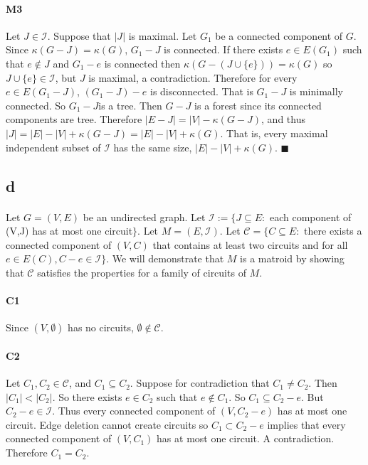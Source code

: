 \documentclass[letterpaper,12pt,oneside,onecolumn]{report}
\begin{document}
\paragraph{M3}
Let $J \in \mathcal{I}$. Suppose that $|J|$ is maximal. Let $G_1$ be a connected component of $G$. Since $\kappa(G-J) = \kappa(G)$, $G_1 - J$ is connected. If there exists $e \in E(G_1)$ such that $e \not\in J$ and $G_1 - e$ is connected then $\kappa(G-(J \cup \{e\})) = \kappa(G)$ so $J \cup \{e\} \in \mathcal{I}$, but $J$ is maximal, a contradiction. Therefore for every $e \in E(G_1-J)$, $(G_1 - J) - e$ is disconnected. That is $G_1 - J$ is minimally connected. So $G_1 - J$is a tree. Then $G - J$ is a forest since its connected components are tree. Therefore $|E-J| = |V| - \kappa(G-J)$, and thus $|J| = |E| - |V| + \kappa(G-J) = |E| - |V| + \kappa(G)$. That is, every maximal independent subset of $\mathcal{I}$ has the same size, $|E| - |V| + \kappa(G)$. $\blacksquare$
\subsection*{d}
\paragraph{}
Let $G=(V,E)$ be an undirected graph. Let $\mathcal{I} := \{J \subseteq E : $ each component of (V,J) has at most one circuit$\}$. Let $M = (E, \mathcal{I})$. Let $\mathcal{C} = \{C \subseteq E : $ there exists a connected component of $(V,C)$ that contains at least two circuits and for all $e \in E(C), C - e \in \mathcal{I} \}$. We will demonstrate that $M$ is a matroid by showing that $\mathcal{C}$ satisfies the properties for a family of circuits of $M$.
\paragraph{C1}
Since $(V, \emptyset)$ has no circuits, $\emptyset \not\in \mathcal{C}$.
\paragraph{C2}
Let $C_1, C_2 \in \mathcal{C}$, and $C_1 \subseteq C_2$. Suppose for contradiction that $C_1 \neq C_2$. Then $|C_1| < |C_2|$. So there exists $e \in C_2$ such that $e \not\in C_1$. So $C_1 \subseteq C_2 - e$. But $C_2 - e \in \mathcal{I}$. Thus every connected component of $(V,C_2 - e)$ has at most one circuit. Edge deletion cannot create circuits so $C_1 \subset C_2 - e$ implies that every connected component of $(V,C_1)$ has at most one circuit. A contradiction. Therefore $C_1 = C_2$.
\end{document}
